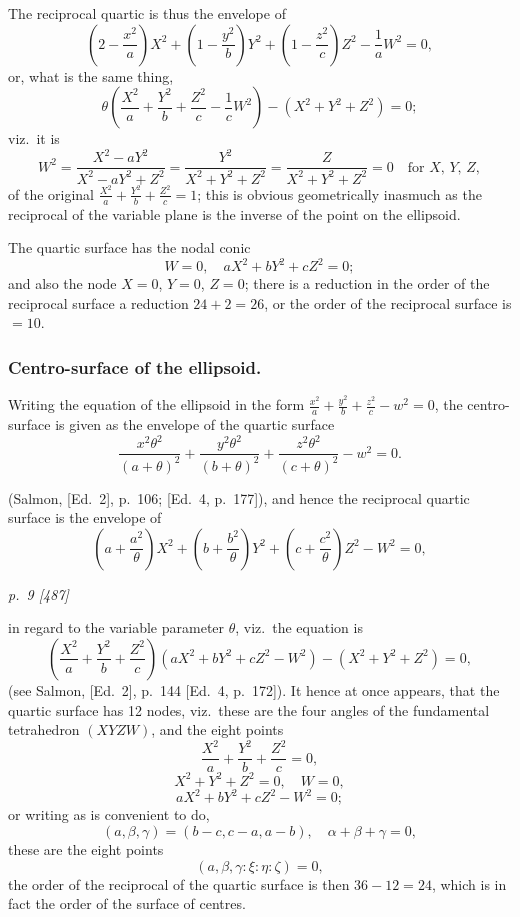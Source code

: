 \documentclass[11pt,a4paper]{book}
\begin{document}
The reciprocal quartic is thus the envelope of
\[
\left(2 - \frac{x^2}{a}\right)X^2 + \left(1 - \frac{y^2}{b}\right)Y^2 + \left(1 - \frac{z^2}{c}\right)Z^2 - \frac{1}{a}W^2 = 0,
\]
or, what is the same thing,
\[
\theta\left(\frac{X^2}{a} + \frac{Y^2}{b} + \frac{Z^2}{c} - \frac{1}{c}W^2\right) - (X^2 + Y^2 + Z^2) = 0;
\]
viz.\ it is
\[
W^2 = \frac{X^2 - aY^2}{X^2 - aY^2 + Z^2} = \frac{Y^2}{X^2 + Y^2 + Z^2} = \frac{Z}{X^2 + Y^2 + Z^2} = 0 \quad \text{for } X, \, Y, \, Z,
\]
of the original $\frac{X^2}{a} + \frac{Y^2}{b} + \frac{Z^2}{c} = 1$; this is obvious geometrically inasmuch as the
reciprocal of the variable plane is the inverse of the point on the ellipsoid.

The quartic surface has the nodal conic
\[
W = 0, \quad aX^2 + bY^2 + cZ^2 = 0;
\]
and also the node $X = 0$, $Y = 0$, $Z = 0$; there is a reduction in the order of the
reciprocal surface a reduction $24 + 2 = 26$, or the order of the reciprocal surface is $= 10$.

\subsubsection*{Centro-surface of the ellipsoid.}

Writing the equation of the ellipsoid in the form $\frac{x^2}{a} + \frac{y^2}{b} + \frac{z^2}{c} - w^2 = 0$, the centro-surface is given as the envelope of the quartic surface
\[
\frac{x^2 \theta^2}{(a + \theta)^2} + \frac{y^2 \theta^2}{(b + \theta)^2} + \frac{z^2 \theta^2}{(c + \theta)^2} - w^2 = 0.
\]

(Salmon, [Ed.\ 2], p.~106; [Ed.\ 4, p.~177]), and hence the reciprocal quartic surface is the
envelope of
\[
\left(a + \frac{a^2}{\theta}\right)X^2 + \left(b + \frac{b^2}{\theta}\right)Y^2 + \left(c + \frac{c^2}{\theta}\right)Z^2 - W^2 = 0,
\]

\clearpage

\bigskip
\textit{p.~9 [487]}
\smallskip

in regard to the variable parameter $\theta$, viz.\ the equation is
\[
\left(\frac{X^2}{a} + \frac{Y^2}{b} + \frac{Z^2}{c}\right)(aX^2 + bY^2 + cZ^2 - W^2) - (X^2 + Y^2 + Z^2) = 0,
\]
(see Salmon, [Ed.\ 2], p.~144 [Ed.\ 4, p.~172]).  It hence at once appears, that the quartic
surface has 12 nodes, viz.\ these are the four angles of the fundamental tetrahedron
$(XYZW)$, and the eight points
\[
\frac{X^2}{a} + \frac{Y^2}{b} + \frac{Z^2}{c} = 0,
\]
\[
X^2 + Y^2 + Z^2 = 0, \quad W = 0,
\]
\[
aX^2 + bY^2 + cZ^2 - W^2 = 0;
\]
or writing as is convenient to do,
\[
(a, \beta, \gamma) = (b - c, c - a, a - b), \quad \alpha + \beta + \gamma = 0,
\]
these are the eight points
\[
(a, \beta, \gamma : \xi : \eta : \zeta) = 0,
\]
the order of the reciprocal of the quartic surface is then $36 - 12 = 24$, which is in
fact the order of the surface of centres.
\end{document}
